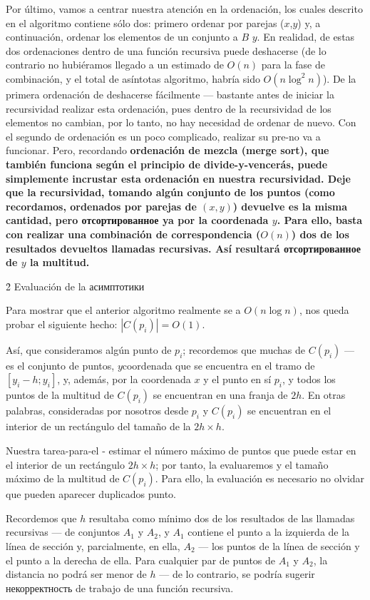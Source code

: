 Por último, vamos a centrar nuestra atención en la ordenación, los cuales descrito en el algoritmo contiene sólo dos: primero ordenar por parejas ($x$,$y$) y, a continuación, ordenar los elementos de un conjunto a $B$ $y$. En realidad, de estas dos ordenaciones dentro de una función recursiva puede deshacerse (de lo contrario no hubiéramos llegado a un estimado de $O(n)$ para la fase de combinación, y el total de asíntotas algoritmo, habría sido $O(n \log^2 n)$). De la primera ordenación de deshacerse fácilmente --- bastante antes de iniciar la recursividad realizar esta ordenación, pues dentro de la recursividad de los elementos no cambian, por lo tanto, no hay necesidad de ordenar de nuevo. Con el segundo de ordenación es un poco complicado, realizar su pre-no va a funcionar. Pero, recordando \bf{ordenación de mezcla} (merge sort), que también funciona según el principio de divide-y-vencerás, puede simplemente incrustar esta ordenación en nuestra recursividad. Deje que la recursividad, tomando algún conjunto de los puntos (como recordamos, ordenados por parejas de $(x,y)$) devuelve es la misma cantidad, pero отсортированное ya por la coordenada $y$. Para ello, basta con realizar una combinación de correspondencia ($O(n)$) dos de los resultados devueltos llamadas recursivas. Así resultará отсортированное de $y$ la multitud.


\h2{ Evaluación de la асимптотики }

Para mostrar que el anterior algoritmo realmente se a $O(n \log n)$, nos queda probar el siguiente hecho: $|C(p_i)| = O(1)$.

Así, que consideramos algún punto de $p_i$; recordemos que muchas de $C(p_i)$ --- es el conjunto de puntos, $y$coordenada que se encuentra en el tramo de $[y_i-h; y_i]$, y, además, por la coordenada $x$ y el punto en sí $p_i$, y todos los puntos de la multitud de $C(p_i)$ se encuentran en una franja de $2h$. En otras palabras, consideradas por nosotros desde $p_i$ y $C(p_i)$ se encuentran en el interior de un rectángulo del tamaño de la $2h \times h$.

Nuestra tarea-para-el - estimar el número máximo de puntos que puede estar en el interior de un rectángulo $2h \times h$; por tanto, la evaluaremos y el tamaño máximo de la multitud de $C(p_i)$. Para ello, la evaluación es necesario no olvidar que pueden aparecer duplicados punto.

Recordemos que $h$ resultaba como mínimo dos de los resultados de las llamadas recursivas --- de conjuntos $A_1$ y $A_2$, y $A_1$ contiene el punto a la izquierda de la línea de sección y, parcialmente, en ella, $A_2$ --- los puntos de la línea de sección y el punto a la derecha de ella. Para cualquier par de puntos de $A_1$ y $A_2$, la distancia no podrá ser menor de $h$ --- de lo contrario, se podría sugerir некорректность de trabajo de una función recursiva.

